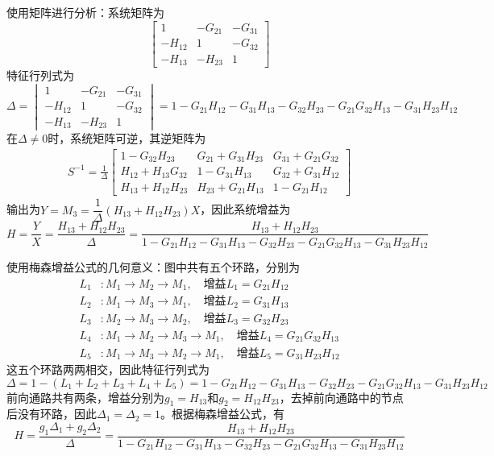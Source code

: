 \begin{example}[单入单出信号流图]
\begin{figure}[H]
    \end{figure}
    使用矩阵进行分析：系统矩阵为
    \[\begin{bmatrix}
        1 & -G_{21} & -G_{31} \\
        -H_{12} & 1 & -G_{32} \\
        -H_{13} & -H_{23} & 1
    \end{bmatrix}\]
    特征行列式为
    $$\Delta=\begin{vmatrix}
        1 & -G_{21} & -G_{31} \\
        -H_{12} & 1 & -G_{32} \\
        -H_{13} & -H_{23} & 1
    \end{vmatrix}=1-G_{21}H_{12}-G_{31}H_{13}-G_{32}H_{23}-G_{21}G_{32}H_{13}-G_{31}H_{23}H_{12}$$
    在$\Delta\neq 0$时，系统矩阵可逆，其逆矩阵为\begin{align*}
        S^{-1}=\frac{1}{\Delta}\begin{bmatrix}
            1-G_{32}H_{23} & G_{21}+G_{31}H_{23} & G_{31}+G_{21}G_{32} \\
            H_{12}+H_{13}G_{32} & 1-G_{31}H_{13} & G_{32}+G_{31}H_{12} \\
            H_{13}+H_{12}H_{23} & H_{23}+G_{21}H_{13} & 1-G_{21}H_{12}
        \end{bmatrix}
    \end{align*}
    输出为$Y=M_3=\dfrac{1}{\Delta}(H_{13}+H_{12}H_{23})X$，因此系统增益为
    \[H=\frac{Y}{X}=\frac{H_{13}+H_{12}H_{23}}{\Delta}=\frac{H_{13}+H_{12}H_{23}}{1-G_{21}H_{12}-G_{31}H_{13}-G_{32}H_{23}-G_{21}G_{32}H_{13}-G_{31}H_{23}H_{12}}\]

    使用梅森增益公式的几何意义：图中共有五个环路，分别为\begin{align*}
        L_1&:M_1\to M_2\to M_1,\quad \text{增益}L_1=G_{21}H_{12}\\
        L_2&:M_1\to M_3\to M_1,\quad \text{增益}L_2=G_{31}H_{13}\\
        L_3&:M_2\to M_3\to M_2,\quad \text{增益}L_3=G_{32}H_{23}\\
        L_4&:M_1\to M_2\to M_3\to M_1,\quad \text{增益}L_4=G_{21}G_{32}H_{13}\\
        L_5&:M_1\to M_3\to M_2\to M_1,\quad \text{增益}L_5=G_{31}H_{23}H_{12}
    \end{align*}
    这五个环路两两相交，因此特征行列式为
    \[\Delta=1-(L_1+L_2+L_3+L_4+L_5)=1-G_{21}H_{12}-G_{31}H_{13}-G_{32}H_{23}-G_{21}G_{32}H_{13}-G_{31}H_{23}H_{12}\]
    前向通路共有两条，增益分别为$g_1=H_{13}$和$g_2=H_{12}H_{23}$，去掉前向通路中的节点后没有环路，因此$\Delta_1=\Delta_2=1$。根据梅森增益公式，有
    \[H=\frac{g_1\Delta_1+g_2\Delta_2}{\Delta}=\frac{H_{13}+H_{12}H_{23}}{1-G_{21}H_{12}-G_{31}H_{13}-G_{32}H_{23}-G_{21}G_{32}H_{13}-G_{31}H_{23}H_{12}}\]
\end{example}

